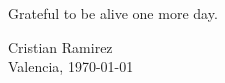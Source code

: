 Grateful to be alive one more day.
\begin{flushright}
Cristian Ramirez \\
Valencia, \today
\end{flushright}